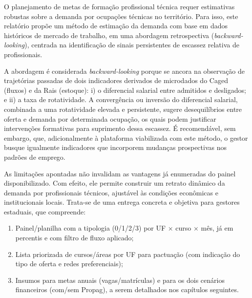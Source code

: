 O planejamento de metas de formação profissional técnica requer estimativas robustas sobre a demanda por ocupações técnicas no território. Para isso, este relatório propõe um método de estimação da demanda com base em dados históricos de mercado de trabalho, em uma abordagem retrospectiva (\textit{backward-looking}), centrada na identificação de sinais persistentes de escassez relativa de profissionais.

A abordagem é considerada \textit{backward-looking} porque se ancora na observação de trajetórias passadas de dois indicadores derivados de microdados do Caged (fluxos) e da Rais (estoque): i) o diferencial salarial entre admitidos e desligados; e ii) a taxa de rotatividade. A convergência ou inversão do diferencial salarial, combinada a uma rotatividade elevada e persistente, sugere desequilíbrios entre oferta e demanda por determinada ocupação, os quais podem justificar intervenções formativas para suprimento dessa escassez. É recomendável, sem embargo, que, adicionalmente à plataforma viabilizada com este método, o gestor busque igualmente indicadores que incorporem mudanças prospectivas nos padrões de emprego.

As limitações apontadas não invalidam as vantagens já enumeradas do painel disponibilizado. Com efeito, ele permite construir um retrato dinâmico da demanda por profissionais técnicos, ajustável às condições econômicas e institucionais locais. Trata-se de uma entrega concreta e objetiva para gestores estaduais, que compreende:

\begin{enumerate}
	\item Painel/planilha com a tipologia (0/1/2/3) por UF × curso × mês, já em percentis e com filtro de fluxo aplicado;
	\item Lista priorizada de cursos/áreas por UF para pactuação (com indicação do tipo de oferta e redes preferenciais);
	\item Insumos para metas anuais (vagas/matrículas) e para os dois cenários financeiros (com/sem Propag), a serem detalhados nos capítulos seguintes.
\end{enumerate}




